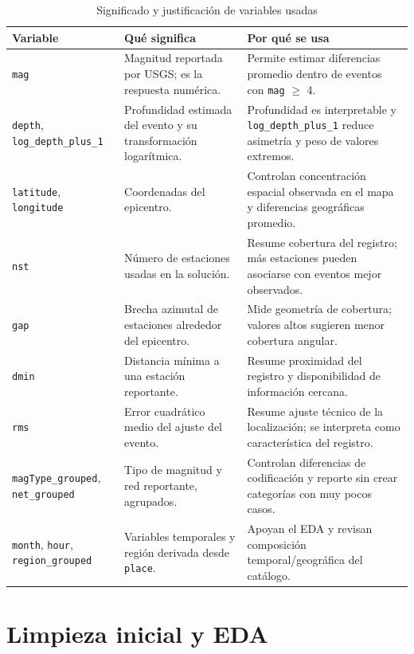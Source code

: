 \documentclass{style}
\newcommand{\var}[1]{\texttt{#1}}
\newcommand{\reporttablesize}{\footnotesize}
\begin{document}
\begin{table}[H]
\centering
\caption{Significado y justificación de variables usadas}
\reporttablesize
\begin{tabularx}{\textwidth}{@{}p{}p{}X@{}}
\toprule
Variable & Qué significa & Por qué se usa \\
\midrule
\var{mag} & Magnitud reportada por USGS; es la respuesta numérica. & Permite estimar diferencias promedio dentro de eventos con \var{mag} $\geq$ 4. \\
\var{depth}, \var{log\_depth\_plus\_1} & Profundidad estimada del evento y su transformación logarítmica. & Profundidad es interpretable y \var{log\_depth\_plus\_1} reduce asimetría y peso de valores extremos. \\
\var{latitude}, \var{longitude} & Coordenadas del epicentro. & Controlan concentración espacial observada en el mapa y diferencias geográficas promedio. \\
\var{nst} & Número de estaciones usadas en la solución. & Resume cobertura del registro; más estaciones pueden asociarse con eventos mejor observados. \\
\var{gap} & Brecha azimutal de estaciones alrededor del epicentro. & Mide geometría de cobertura; valores altos sugieren menor cobertura angular. \\
\var{dmin} & Distancia mínima a una estación reportante. & Resume proximidad del registro y disponibilidad de información cercana. \\
\var{rms} & Error cuadrático medio del ajuste del evento. & Resume ajuste técnico de la localización; se interpreta como característica del registro. \\
\var{magType\_grouped}, \var{net\_grouped} & Tipo de magnitud y red reportante, agrupados. & Controlan diferencias de codificación y reporte sin crear categorías con muy pocos casos. \\
\var{month}, \var{hour}, \var{region\_grouped} & Variables temporales y región derivada desde \var{place}. & Apoyan el EDA y revisan composición temporal/geográfica del catálogo. \\
\bottomrule
\end{tabularx}
\end{table}

\section{Limpieza inicial y EDA}
\end{document}
